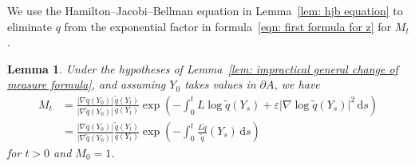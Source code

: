 \documentclass[reqno]{amsart}
\newcommand{\eps}{\varepsilon}
\newcommand{\1}{\mathds{1}}
\renewcommand{\d}{\mathrm{d}}
\newcommand{\grad}{\nabla}
\renewcommand{\L}{L}
\newcommand{\zed}{M}
\newtheorem{lemma}{Lemma}
\theoremstyle{definition}
\theoremstyle{remark}
\begin{document}
We use the Hamilton--Jacobi--Bellman equation in Lemma~\ref{lem: hjb equation} to eliminate $q$ from the exponential factor in formula~\eqref{eqn: first formula for z} for $\zed_t$. 

\begin{lemma}\label{lem: second impractical change of measure formula}
  Under the hypotheses of Lemma~\ref{lem: impractical general change of measure formula}, and assuming $Y_0$ takes values in $\partial A$,  we have
  \begin{align}
    \zed_t&= \frac{\lvert \grad  q (Y_0) \rvert}{\lvert   \grad \tilde q (Y_0) \rvert} \frac{\tilde q(Y_t)}{q(Y_t)} \exp \left (-\int_0^t  \L \log \tilde q (Y_s)  + \eps  \lvert \grad \log \tilde q(Y_s) \rvert^2 \, \d s  \right ) \nonumber \\
    &= \frac{\lvert \grad  q (Y_0) \rvert}{\lvert \grad \tilde q (Y_0) \rvert} \frac{\tilde q(Y_t)}{q(Y_t)} \exp \left (-\int_0^t \frac{L \tilde q}{\tilde q}(Y_s) \, \d s  \right ) \label{eqn: second formula for zt}
  \end{align}
  for $t>0$ and $\zed_0=1$. 
\end{lemma}
\end{document}

